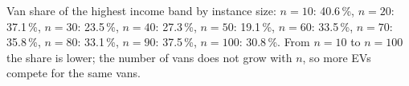 Van share of the highest income band by instance size: $n=10$: 40.6\,\%, $n=20$: 37.1\,\%, $n=30$: 23.5\,\%, $n=40$: 27.3\,\%, $n=50$: 19.1\,\%, $n=60$: 33.5\,\%, $n=70$: 35.8\,\%, $n=80$: 33.1\,\%, $n=90$: 37.5\,\%, $n=100$: 30.8\,\%. From $n=10$ to $n=100$ the share is lower; the number of vans does not grow with $n$, so more EVs compete for the same vans.
